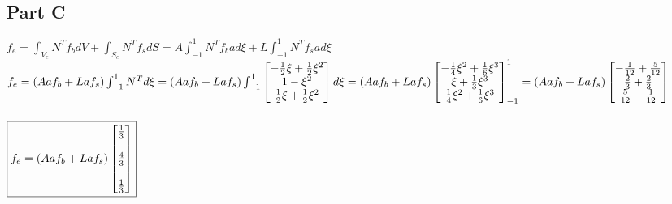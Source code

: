 \documentclass{article}
\begin{document}
\subsection*{Part C}
$f_e=\int_{V_e}N^Tf_bdV+\int_{S_e}N^Tf_sdS=A\int_{-1}^{1}N^Tf_bad\xi+L\int_{-1}^{1}N^Tf_sad\xi$ \\
$f_e=(Aaf_b+Laf_s)\int_{-1}^{1}N^Td\xi=(Aaf_b+Laf_s)\int_{-1}^{1}\begin{bmatrix}
    -\frac{1}{2}\xi+\frac{1}{2}\xi^2 \\ 1-\xi^2 \\ \frac{1}{2}\xi+\frac{1}{2}\xi^2
\end{bmatrix}d\xi=\\
(Aaf_b+Laf_s)\begin{bmatrix}
    -\frac{1}{4}\xi^2+\frac{1}{6}\xi^3 \\
    \xi+\frac{1}{3}\xi^3 \\
    \frac{1}{4}\xi^2+\frac{1}{6}\xi^3
\end{bmatrix}_{-1}^1=(Aaf_b+Laf_s)\begin{bmatrix}
    -\frac{1}{12}+\frac{5}{12} \\
    \frac{2}{3}+\frac{2}{3} \\
    \frac{5}{12}-\frac{1}{12}
\end{bmatrix}$ \\\\
$\fbox{$f_e=(Aaf_b+Laf_s)\begin{bmatrix}
    \frac{1}{3} \\\\ \frac{4}{3} \\\\ \frac{1}{3}
\end{bmatrix}$}$
\end{document}
